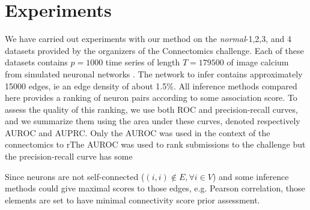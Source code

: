 \documentclass[wcp]{jmlr}
\begin{document}

\section{Experiments} \label{sec:results}


We have carried out experiments with our method on the
\textit{normal}-1,2,3, and 4 datasets provided by the organizers of
the Connectomics challenge. Each of these datasets contains $p=1000$
time series of length $T=179500$ of image calcium from simulated
neuronal networks \citep{stetter2012model}. The network to infer
contains approximately 15000 edges, ie an edge density of about
1.5\%. All inference methods compared here provides a ranking of
neuron pairs according to some association score. To assess the
quality of this ranking, we use both ROC and precision-recall curves,
and we summarize them using the area under these curves, denoted
respectively AUROC and AUPRC. Only the AUROC was used in the context of the connectomics to rThe AUROC was
used to rank submissions to the challenge but the precision-recall
curve has some\citep{schrynemackers2013protocols}

Since neurons are
not self-connected ($(i, i) \not \in E, \forall i \in V$) and some
inference methods could give maximal scores to those edges,
e.g. Pearson correlation, those elements are set to have minimal
connectivity score prior assessment.
\end{document}
